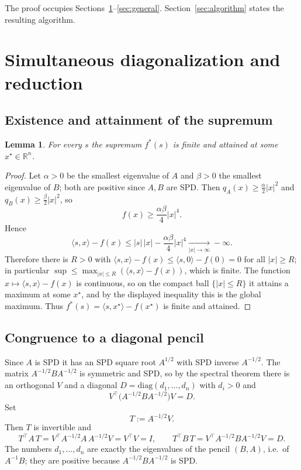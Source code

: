 \documentclass{amsart}
\newtheorem{lemma}{Lemma}
\theoremstyle{definition}
\begin{document}
The proof occupies Sections~\ref{sec:reduction}--\ref{sec:general}. Section~\ref{sec:algorithm} states the resulting algorithm.

\section{Simultaneous diagonalization and reduction}\label{sec:reduction}

\subsection{Existence and attainment of the supremum}

\begin{lemma}\label{lem:attain}
For every $s$ the supremum $f^*(s)$ is finite and attained at some $x^\star\in\mathbb{R}^n$.
\end{lemma}

\begin{proof}
Let $\alpha>0$ be the smallest eigenvalue of $A$ and $\beta>0$ the smallest eigenvalue of $B$; both are positive since $A,B$ are SPD. Then $q_A(x)\ge\frac{\alpha}{2}|x|^2$ and $q_B(x)\ge\frac{\beta}{2}|x|^2$, so
\[
f(x)\ge\frac{\alpha\beta}{4}|x|^4 .
\]
Hence
\[
\langle s,x\rangle-f(x)\le |s|\,|x|-\frac{\alpha\beta}{4}|x|^4\xrightarrow[|x|\to\infty]{}-\infty .
\]
Therefore there is $R>0$ with $\langle s,x\rangle-f(x)\le \langle s,0\rangle-f(0)=0$ for all $|x|\ge R$; in particular $\sup\le \max_{|x|\le R}(\langle s,x\rangle-f(x))$, which is finite. The function $x\mapsto\langle s,x\rangle-f(x)$ is continuous, so on the compact ball $\{|x|\le R\}$ it attains a maximum at some $x^\star$, and by the displayed inequality this is the global maximum. Thus $f^*(s)=\langle s,x^\star\rangle-f(x^\star)$ is finite and attained.
\end{proof}

\subsection{Congruence to a diagonal pencil}

Since $A$ is SPD it has an SPD square root $A^{1/2}$ with SPD inverse $A^{-1/2}$. The matrix $A^{-1/2}BA^{-1/2}$ is symmetric and SPD, so by the spectral theorem there is an orthogonal $V$ and a diagonal $D=\mathrm{diag}(d_1,\dots,d_n)$ with $d_i>0$ and
\[
V^\top\!\bigl(A^{-1/2}BA^{-1/2}\bigr)V=D .
\]
Set
\begin{equation}\label{eq:T}
T:=A^{-1/2}V .
\end{equation}
Then $T$ is invertible and
\begin{equation}\label{eq:congruence}
T^\top A\,T=V^\top A^{-1/2}A\,A^{-1/2}V=V^\top V=I,
\qquad
T^\top B\,T=V^\top A^{-1/2}B A^{-1/2}V=D .
\end{equation}
The numbers $d_1,\dots,d_n$ are exactly the eigenvalues of the pencil $(B,A)$, i.e.\ of $A^{-1}B$; they are positive because $A^{-1/2}BA^{-1/2}$ is SPD.
\end{document}
